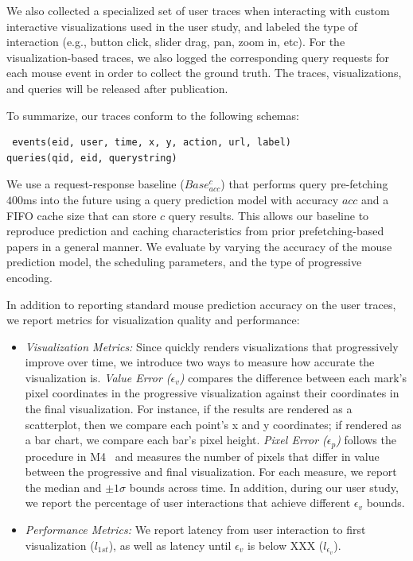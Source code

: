 We also collected a specialized set of user traces when interacting with custom interactive visualizations used in the user study, and labeled the type of interaction (e.g., button click, slider drag, pan, zoom in, etc).  For the visualization-based traces, we also logged the corresponding query requests for each mouse event in order to collect the ground truth.  The traces, visualizations, and queries will be released after publication.

To summarize, our traces conform to the following schemas:
{\small \begin{verbatim}
 events(eid, user, time, x, y, action, url, label)
queries(qid, eid, querystring)
\end{verbatim}}

We use a request-response baseline ($Base_{acc}^{c}$) that performs query pre-fetching $400$ms into the future using a query prediction model with accuracy $acc$ and a FIFO cache size that can store $c$ query results.   This allows our baseline to reproduce prediction and caching characteristics from prior prefetching-based papers in a general manner.  We evaluate \sys by varying the accuracy of the mouse prediction model, the scheduling parameters, and the type of progressive encoding.  

In addition to reporting standard mouse prediction accuracy on the user traces, we report metrics for visualization quality and performance:

\begin{itemize}[leftmargin=*, topsep=0mm, itemsep=0mm]
  \item {\it Visualization Metrics: } Since \sys quickly renders visualizations that progressively improve over time, we introduce two ways to measure how accurate the visualization is.  {\it Value Error ($\epsilon_v$)} compares the difference between each mark's pixel coordinates in the progressive visualization against their coordinates in the final visualization.  For instance, if the results are rendered as a scatterplot, then we compare each point's x and y coordinates; if rendered as a bar chart, we compare each bar's pixel height.  {\it Pixel Error ($\epsilon_p$)} follows the procedure in M4~\cite{m4} and measures the number of pixels that differ in value between the progressive and final visualization.  For each measure, we report the median and $\pm 1\sigma$ bounds across time.  In addition, during our user study, we report the percentage of user interactions that achieve different $\epsilon_v$ bounds.

  \item {\it Performance Metrics: }  We report latency from user interaction to first visualization ($l_{1st}$), as well as latency until $\epsilon_v$ is below XXX ($l_{\epsilon_v}$).  
\end{itemize}

